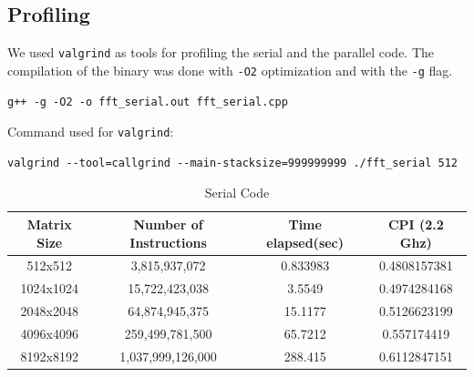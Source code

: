 \documentclass{article}
\begin{document}
\subsection{Profiling}

We used \texttt{valgrind} as tools for profiling the serial and the parallel code.
The compilation of the binary was done with \texttt{-O2} optimization and with the \texttt{-g} flag.

\begin{verbatim}
g++ -g -O2 -o fft_serial.out fft_serial.cpp
\end{verbatim}

Command used for \texttt{valgrind}:

\begin{verbatim}
valgrind --tool=callgrind --main-stacksize=999999999 ./fft_serial 512
\end{verbatim}

\begin{table}[htbp]
\centering
\begin{tabular}{|c|c|c|c|}
\hline
Matrix Size & Number of Instructions & Time elapsed(sec) & CPI (2.2 Ghz) \\
\hline
512x512 & 3,815,937,072 & 0.833983 & 0.4808157381 \\
\hline
1024x1024 & 15,722,423,038 & 3.5549 & 0.4974284168 \\
\hline
2048x2048 & 64,874,945,375 & 15.1177 & 0.5126623199 \\
\hline
4096x4096 & 259,499,781,500 & 65.7212 & 0.557174419 \\
\hline
8192x8192 & 1,037,999,126,000 & 288.415 & 0.6112847151 \\
\hline
\end{tabular}
\caption{Serial Code}
\label{tab:serial}
\end{table}
\end{document}
